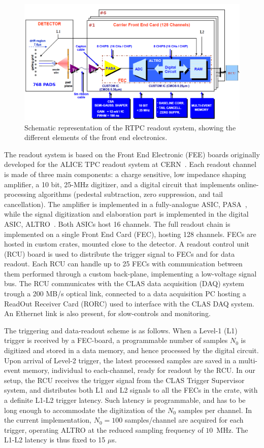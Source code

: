 \documentclass[preprint,5p]{elsarticle}
\begin{document}
\begin{figure}[tb]
   \centering
   \includegraphics[width=.75\textwidth]{fig/ReadoutScheme.png}
   \caption[]{Schematic representation of the RTPC readout system, showing
   the different elements of the front end electronics.} 
   \label{fig:ReadoutScheme}
\end{figure}

The readout system is based on the Front End Electronic (FEE) boards originally 
developed for the ALICE TPC readout system at CERN~\cite{ALICE-FEE}. Each 
readout channel is made of three main components: a charge sensitive, low 
impedance shaping amplifier, a 10 bit, 25-MHz digitizer, and a digital circuit 
that implements online-processing algorithms (pedestal subtraction, zero 
suppression, and tail cancellation). The amplifier is implemented in a 
fully-analogue ASIC, PASA~\cite{ALICE-PASA}, while the signal 
digitization and elaboration part is implemented in the digital ASIC, 
ALTRO~\cite{ALICE-ALTRO}. Both ASICs host 16 channels. The full readout 
chain is implemented on a single Front End Card (FEC), hosting 128 channels. 
FECs are hosted in custom crates, mounted close to the detector. A readout 
control unit (RCU) board is used to distribute the trigger signal to FECs 
and for data readout. Each RCU can handle up to 25 FECs with communication 
between them performed through a 
custom back-plane, implementing a low-voltage signal bus. The RCU communicates 
with the CLAS data acquisition (DAQ) system 
trough a 200 MB/s optical link, connected to a data acquisition PC hosting 
a ReadOut Receiver Card (RORC) used to interface with 
the CLAS DAQ system. An Ethernet link is also present, for slow-controls and 
monitoring.

The triggering and data-readout scheme is as follows. When a Level-1 (L1) trigger 
is received by a FEC-board, a programmable number of samples $N_0$ is digitized 
and stored in a data memory, and hence processed by the digital circuit. Upon 
arrival of Level-2 trigger, the latest processed samples are saved in a 
multi-event memory, individual to each-channel, ready for readout by the RCU.  
In our setup, the RCU receives the trigger signal from the CLAS Trigger 
Supervisor system, and distributes both L1 and L2 signals to all the FECs in 
the crate, with a definite L1-L2 trigger latency. Such latency is programmable, 
and has to be long enough to accommodate the digitization of the $N_0$ samples 
per channel.  In the current implementation, $N_0=100$ samples/channel are 
acquired for each trigger, operating ALTRO at the reduced sampling frequency of 
$10$~MHz. The L1-L2 latency is thus fixed to 15 $\mu$s.
\end{document}
